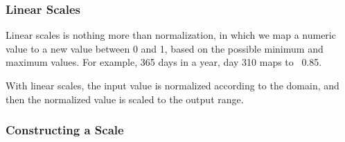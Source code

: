 \documentclass[red]{beamer}
\begin{document}
\begin{frame}
  \frametitle{Linear Scales}
  Linear scales is nothing more than normalization, in which we map a numeric value to a 
  new value between 0 and 1, based on the possible minimum and maximum values. For example, 
  365 days in a year, day 310 maps to ~0.85. 
  \newline
  
  With linear scales, the input value is normalized according to the domain, and then the 
  normalized value is scaled to the output range. 
\end{frame}

\begin{frame}
  \frametitle{Constructing a Scale}
  \lstll
\end{frame}
\end{document}
